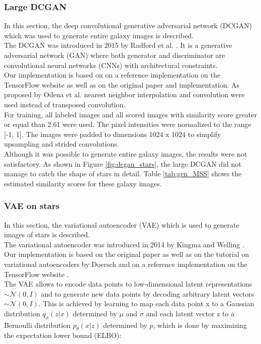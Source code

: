 \documentclass[10pt,conference,compsocconf]{IEEEtran}
\begin{document}
\subsubsection{Large DCGAN} In this section, the deep convolutional generative adversarial network (DCGAN) which was used to generate entire galaxy images is described. \\
The DCGAN was introduced in 2015 by Radford et al. \cite{Radford}. It is a generative adversarial network (GAN) where both generator and discriminator are convolutional neural networks (CNNs) with architectural constraints. \\
Our implementation is based on on a reference implementation on the TensorFlow website \cite{dcgantf} as well as on the original paper and implementation. As proposed by Odena et al. \cite{Odena} nearest neighbor interpolation and convolution were used instead of transposed convolution. \\
For training, all labeled images and all scored images with similarity score greater or equal than 2.61 were used. The pixel intensities were normalized to the range [-1, 1]. The images were padded to dimensions 1024 x 1024 to simplify upsampling and strided convolutions. \\
Although it was possible to generate entire galaxy images, the results were not satisfactory. As shown in Figure \ref{fig:dcgan_stars}, the large DCGAN did not manage to catch the shape of stars in detail. Table \ref{tab:gen_MSS} shows the estimated similarity scores for these galaxy images.
\subsubsection{VAE on stars} %
In this section, the variational autoencoder (VAE) which is used to generate images of stars is described. \\
The variational autoencoder was introduced in 2014 by Kingma and Welling \cite{DBLP:journals/corr/KingmaW13}. Our implementation is based on the original paper as well as on the tutorial on variational autoencoders by Doersch \cite{doersch2016tutorial} and on a reference implementation on the TensorFlow website \cite{cvaetf}. \\
The VAE allows to encode data points to low-dimensional latent representations  $\sim\mathcal{N}(0, I)$ and to generate new data points by decoding arbitrary latent vectors $\sim\mathcal{N}(0, I)$. This is achieved by learning to map each data point x to a Gaussian distribution $q_{\phi}(z|x)$ determined by $\mu$ and $\sigma$ and each latent vector z to a Bernoulli distribution $p_{\theta}(x|z)$ determined by $p$, which is done by maximizing the expectation lower bound (ELBO):
\end{document}
